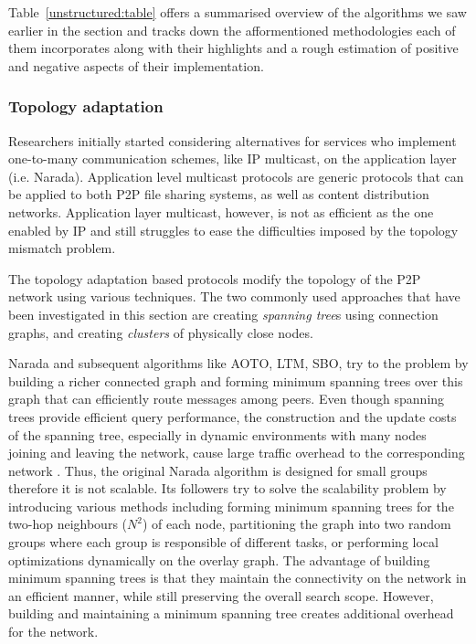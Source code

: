 Table~\ref{unstructured:table} offers a summarised overview of the algorithms
we saw earlier in the section and tracks down the afformentioned methodologies
each of them incorporates along with their highlights and a rough estimation of
positive and negative aspects of their implementation.



\subsubsection{Topology adaptation}
Researchers initially started considering alternatives for services who
implement one-to-many communication schemes, like IP multicast, on the
application layer (i.e. Narada). Application level multicast protocols
are generic protocols that can be applied to both P2P file sharing systems, as
well as content distribution networks. Application layer multicast, however, is
not as efficient as the one enabled by IP and still struggles to ease the
difficulties imposed by the topology mismatch problem.

The topology adaptation based protocols modify the topology of the P2P network
using various techniques. The two commonly used approaches that have been
investigated in this section are creating \emph{spanning tree}s using connection
graphs, and creating \emph{clusters} of physically close nodes.

Narada and subsequent algorithms like AOTO, LTM, SBO, try to the problem by
building a richer connected graph and forming minimum spanning trees over this
graph that can efficiently route messages among peers. Even though spanning
trees provide efficient query performance, the construction and the update costs
of the spanning tree, especially in dynamic environments with many nodes joining
and leaving the network, cause large traffic overhead to the corresponding
network \cite{chu_esm_2000,chu_esm_2002}. Thus, the original Narada algorithm is
designed for small groups therefore it is not scalable. Its followers try to
solve the scalability problem by introducing various methods including forming
minimum spanning trees for the two-hop neighbours ($N^2$) of each node,
partitioning the graph into two random groups where each group is responsible of
different tasks, or performing local optimizations dynamically on the overlay
graph. The advantage of building minimum spanning trees is that they maintain
the connectivity on the network in an efficient manner, while still preserving
the overall search scope. However, building and maintaining a minimum spanning
tree creates additional overhead for the network.

